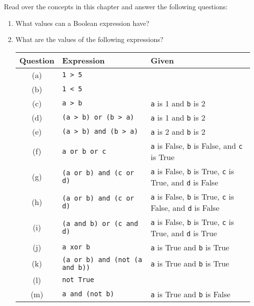 Read over the concepts in this chapter and answer the following questions:
\begin{enumerate}
  \item What values can a Boolean expression have?
  \item What are the values of the following expressions?
  
  \begin{table}[h]
    \centering
    \begin{tabular}{|c|l|l|}
      \hline
      \textbf{Question} & \textbf{Expression} & \textbf{Given} \\
      \hline
      (a) & \texttt{1 > 5} & \\
      \hline
      (b) & \texttt{1 < 5} & \\
      \hline
      (c) & \texttt{a > b} & \texttt{a} is 1 and \texttt{b} is 2 \\
      \hline
      (d) & \texttt{(a > b) or (b > a)} & \texttt{a} is 1 and \texttt{b} is 2 \\
      \hline
      (e) & \texttt{(a > b) and (b > a)} & \texttt{a} is 2 and \texttt{b} is 2 \\
      \hline
      (f) & \texttt{a or b or c} & \texttt{a} is False, \texttt{b} is False, and \texttt{c} is True\\
      \hline
      (g) & \texttt{(a or b) and (c or d)} & \texttt{a} is False, \texttt{b} is True, \texttt{c} is True, and \texttt{d} is False \\
      \hline
      (h) & \texttt{(a or b) and (c or d)} & \texttt{a} is False, \texttt{b} is True, \texttt{c} is False, and \texttt{d} is False \\
      \hline
      (i) & \texttt{(a and b) or (c and d)} & \texttt{a} is False, \texttt{b} is True, \texttt{c} is True, and \texttt{d} is True \\
      \hline
      (j) & \texttt{a xor b} & \texttt{a} is True and \texttt{b} is True\\
      \hline
      (k) & \texttt{(a or b) and (not (a and b))} & \texttt{a} is True and \texttt{b} is True\\
      \hline
      (l) & \texttt{not True} & \\
      \hline
      (m) & \texttt{a and (not b)} & \texttt{a} is True and \texttt{b} is False\\
      \hline
    \end{tabular}    
  \end{table}
  
\end{enumerate}
